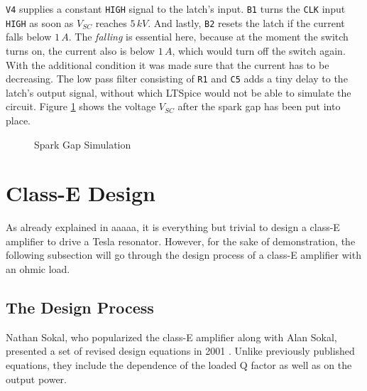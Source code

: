 \texttt{V4} supplies a constant \texttt{HIGH} signal to the latch's input. \texttt{B1} turns the \texttt{CLK} input \texttt{HIGH} as soon as \(V_{SC}\) reaches \(5\,kV\). And lastly, \texttt{B2} resets the latch if the current falls below \(1\,A\). The \emph{falling} is essential here, because at the moment the switch turns on, the current also is below \(1\,A\), which would turn off the switch again. With the additional  condition it was made sure that the current has to be decreasing. The low pass filter consisting of \texttt{R1} and \texttt{C5} adds a tiny delay to the latch's output signal, without which LTSpice would not be able to simulate the circuit. Figure \ref{fig:spark-gap-simulation} shows the voltage \(V_{SC}\) after the spark gap has been put into place.

\begin{figure}[h!]
    \centering
    \caption{Spark Gap Simulation}
    \label{fig:spark-gap-simulation}
\end{figure}

\section{Class-E Design}

As already explained in aaaaa, it is everything but trivial to design a class-E amplifier to drive a Tesla resonator. However, for the sake of demonstration, the following subsection will go through the design process of a class-E amplifier with an ohmic load.

\subsection{The Design Process}
\label{subsec:the-design-process}

Nathan Sokal, who popularized the class-E amplifier along with Alan Sokal, presented a set of revised design equations in 2001 . Unlike previously published equations, they include the dependence of the loaded Q factor as well as on the output power.

